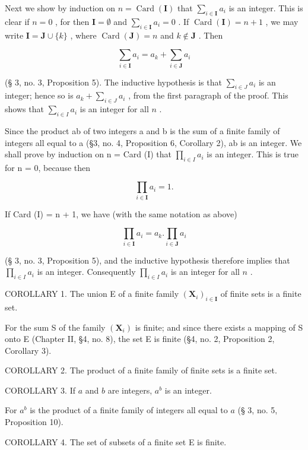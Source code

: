 Next we show by induction on \(n = \operatorname{Card}(\mathbf{I})\) that \(\sum_{i \in \mathbf{I}} a_i\) is an integer. This is clear if \(n = 0\) , for then \(\mathbf{I} = \emptyset\) and \(\sum_{i \in \mathbf{I}} a_i = 0\) . If \(\operatorname{Card}(\mathbf{I}) = n + 1\) , we may write \(\mathbf{I} = \mathbf{J} \cup \{k\}\) , where \(\operatorname{Card}(\mathbf{J}) = n\) and \(k \notin \mathbf{J}\) . Then

\[
\sum_ {i \in \mathbf {I}} a _ {i} = a _ {k} + \sum_ {i \in \mathbf {J}} a _ {i}
\]

(§ 3, no. 3, Proposition 5). The inductive hypothesis is that \(\sum_{i\in J}a_i\) is an integer; hence so is \(a_{k} + \sum_{i\in J}a_{i}\) , from the first paragraph of the proof. This shows that \(\sum_{i\in I}a_{i}\) is an integer for all \(n\) .

Since the product ab of two integers a and b is the sum of a finite family of integers all equal to a (§3, no. 4, Proposition 6, Corollary 2), ab is an integer. We shall prove by induction on n = Card (I) that \(\prod_{i\in I}a_{i}\) is an integer. This is true for n = 0, because then

\[
\prod_ {i \in \mathbf {I}} a _ {i} = 1.
\]

If Card (I) = n + 1, we have (with the same notation as above)

\[
\prod_ {i \in \mathbf {I}} a _ {i} = a _ {k}. \prod_ {i \in \mathbf {J}} a _ {i}
\]

(§ 3, no. 3, Proposition 5), and the inductive hypothesis therefore implies that \(\prod_{i\in I}a_i\) is an integer. Consequently \(\prod_{i\in I}a_i\) is an integer for all \(n\) .

COROLLARY 1. The union E of a finite family \((\mathbf{X}_i)_{i\in \mathbf{I}}\) of finite sets is a finite set.

For the sum S of the family \((\mathbf{X}_{i})\) is finite; and since there exists a mapping of S onto E (Chapter II, §4, no. 8), the set E is finite (§4, no. 2, Proposition 2, Corollary 3).

COROLLARY 2. The product of a finite family of finite sets is a finite set.

COROLLARY 3. If \(a\) and \(b\) are integers, \(a^b\) is an integer.

For \(a^b\) is the product of a finite family of integers all equal to \(a\) (§ 3, no. 5, Proposition 10).

COROLLARY 4. The set of subsets of a finite set E is finite.

